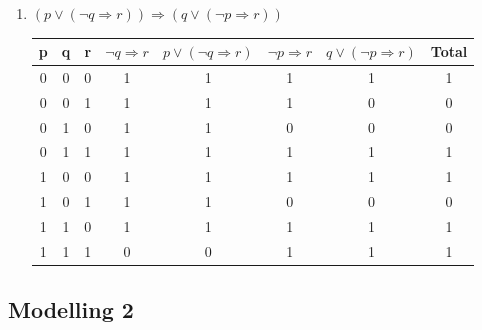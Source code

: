 \begin{large}
\begin{enumerate}[label=(\alph*)]
    \item $ (p \lor(\neg q \Rightarrow r)) \Rightarrow (q \lor (\neg p \Rightarrow r)) $ \\

          \begin{tabular}{c|c|c|c|c|c|c||c}
            p                                 & q     & r & $ \neg q \Rightarrow r $ & $ p \lor (\neg q \Rightarrow r) $ & $ \neg p \Rightarrow r $ &
            $ q \lor (\neg p \Rightarrow r) $ & Total                                                                                                       \\
            \hline\hline
            0                                 & 0     & 0 & 1                        & 1                                 & 1                        & 1 & 1 \\
            \hline
            0                                 & 0     & 1 & 1                        & 1                                 & 1                        & 0 & 0 \\
            \hline
            0                                 & 1     & 0 & 1                        & 1                                 & 0                        & 0 & 0 \\
            \hline
            0                                 & 1     & 1 & 1                        & 1                                 & 1                        & 1 & 1 \\
            \hline
            1                                 & 0     & 0 & 1                        & 1                                 & 1                        & 1 & 1 \\
            \hline
            1                                 & 0     & 1 & 1                        & 1                                 & 0                        & 0 & 0 \\
            \hline
            1                                 & 1     & 0 & 1                        & 1                                 & 1                        & 1 & 1 \\
            \hline
            1                                 & 1     & 1 & 0                        & 0                                 & 1                        & 1 & 1 \\
            \hline
          \end{tabular}
  \end{enumerate}
\end{large}

\subsection{Modelling 2}
\begin{large}

\end{large}